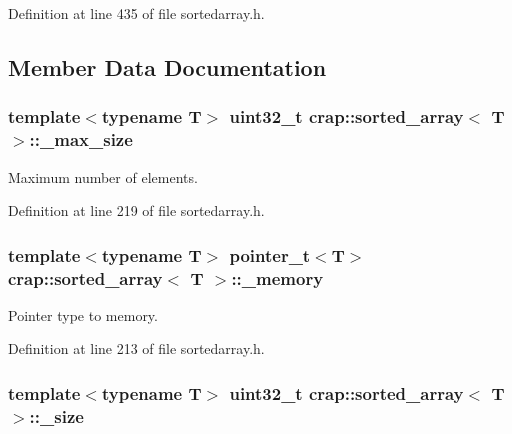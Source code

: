Definition at line 435 of file sortedarray.\+h.



\subsection{Member Data Documentation}
\hypertarget{classcrap_1_1sorted__array_aea8cbb8c465d41aebecdf939113fa993}{}
\subsubsection[{\+\_\+max\+\_\+size}]{\setlength{\rightskip}{0pt plus 5cm}template$<$typename T$>$ uint32\+\_\+t {\bf crap\+::sorted\+\_\+array}$<$ T $>$\+::\+\_\+max\+\_\+size\hspace{0.3cm}{\ttfamily [protected]}}\label{classcrap_1_1sorted__array_aea8cbb8c465d41aebecdf939113fa993}


Maximum number of elements. 



Definition at line 219 of file sortedarray.\+h.

\hypertarget{classcrap_1_1sorted__array_afa20ac100c5b603d0a522c94e7cd549f}{}
\subsubsection[{\+\_\+memory}]{\setlength{\rightskip}{0pt plus 5cm}template$<$typename T$>$ {\bf pointer\+\_\+t}$<$T$>$ {\bf crap\+::sorted\+\_\+array}$<$ T $>$\+::\+\_\+memory\hspace{0.3cm}{\ttfamily [protected]}}\label{classcrap_1_1sorted__array_afa20ac100c5b603d0a522c94e7cd549f}


Pointer type to memory. 



Definition at line 213 of file sortedarray.\+h.

\hypertarget{classcrap_1_1sorted__array_ad33ca1ee9c30abf81658b3c2773ae9d1}{}
\subsubsection[{\+\_\+size}]{\setlength{\rightskip}{0pt plus 5cm}template$<$typename T$>$ uint32\+\_\+t {\bf crap\+::sorted\+\_\+array}$<$ T $>$\+::\+\_\+size\hspace{0.3cm}{\ttfamily [protected]}}\label{classcrap_1_1sorted__array_ad33ca1ee9c30abf81658b3c2773ae9d1}



